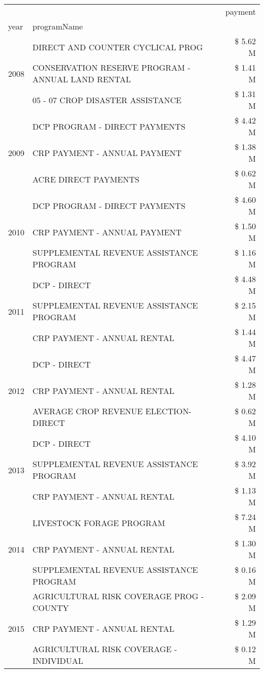 \begin{tabular}{llr}
\toprule
 &  & payment \\
year & programName &  \\
\midrule
\multirow[t]{3}{*}{2008} & DIRECT AND COUNTER CYCLICAL PROG & \$ 5.62 M \\
 & CONSERVATION RESERVE PROGRAM - ANNUAL LAND RENTAL & \$ 1.41 M \\
 & 05 - 07 CROP DISASTER ASSISTANCE & \$ 1.31 M \\
\cline{1-3}
\multirow[t]{3}{*}{2009} & DCP PROGRAM - DIRECT PAYMENTS & \$ 4.42 M \\
 & CRP PAYMENT - ANNUAL PAYMENT & \$ 1.38 M \\
 & ACRE DIRECT PAYMENTS & \$ 0.62 M \\
\cline{1-3}
\multirow[t]{3}{*}{2010} & DCP PROGRAM - DIRECT PAYMENTS & \$ 4.60 M \\
 & CRP PAYMENT - ANNUAL PAYMENT & \$ 1.50 M \\
 & SUPPLEMENTAL REVENUE ASSISTANCE PROGRAM & \$ 1.16 M \\
\cline{1-3}
\multirow[t]{3}{*}{2011} & DCP - DIRECT & \$ 4.48 M \\
 & SUPPLEMENTAL REVENUE ASSISTANCE PROGRAM & \$ 2.15 M \\
 & CRP PAYMENT - ANNUAL RENTAL & \$ 1.44 M \\
\cline{1-3}
\multirow[t]{3}{*}{2012} & DCP - DIRECT & \$ 4.47 M \\
 & CRP PAYMENT - ANNUAL RENTAL & \$ 1.28 M \\
 & AVERAGE CROP REVENUE ELECTION-DIRECT & \$ 0.62 M \\
\cline{1-3}
\multirow[t]{3}{*}{2013} & DCP - DIRECT & \$ 4.10 M \\
 & SUPPLEMENTAL REVENUE ASSISTANCE PROGRAM & \$ 3.92 M \\
 & CRP PAYMENT - ANNUAL RENTAL & \$ 1.13 M \\
\cline{1-3}
\multirow[t]{3}{*}{2014} & LIVESTOCK FORAGE PROGRAM & \$ 7.24 M \\
 & CRP PAYMENT - ANNUAL RENTAL & \$ 1.30 M \\
 & SUPPLEMENTAL REVENUE ASSISTANCE PROGRAM & \$ 0.16 M \\
\cline{1-3}
\multirow[t]{3}{*}{2015} & AGRICULTURAL RISK COVERAGE PROG - COUNTY & \$ 2.09 M \\
 & CRP PAYMENT - ANNUAL RENTAL & \$ 1.29 M \\
 & AGRICULTURAL RISK COVERAGE - INDIVIDUAL & \$ 0.12 M \\

\end{tabular}

